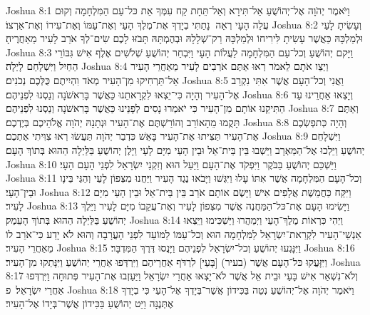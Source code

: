Joshua 8:1	וַיֹּאמֶר יְהֹוָה אֶל־יְהוֹשֻׁעַ אַל־תִּירָא וְאַל־תֵּחָת קַח עִמְּךָ אֵת כּל־עַם הַמִּלְחָמָה וְקוּם עֲלֵה הָעָי רְאֵה  נָתַתִּי בְיָדְךָ אֶת־מֶלֶךְ הָעַי וְאֶת־עַמּוֹ וְאֶת־עִירוֹ וְאֶת־אַרְצוֹ׃
Joshua 8:2	וְעָשִׂיתָ לָעַי וּלְמַלְכָּהּ כַּאֲשֶׁר עָשִׂיתָ לִּירִיחוֹ וּלְמַלְכָּהּ רַק־שְׁלָלָהּ וּבְהֶמְתָּהּ תָּבֹזּוּ לָכֶם שִׂים־לְךָ אֹרֵב לָעִיר מֵאַחֲרֶיהָ׃
Joshua 8:3	וַיָּקם יְהוֹשֻׁעַ וְכל־עַם הַמִּלְחָמָה לַעֲלוֹת הָעָי וַיִּבְחַר יְהוֹשֻׁעַ שְׁלֹשִׁים אֶלֶף אִישׁ גִּבּוֹרֵי הַחַיִל וַיִּשְׁלָחֵם לָיְלָה׃
Joshua 8:4	וַיְצַו אֹתָם לֵאמֹר רְאוּ אַתֶּם אֹרְבִים לָעִיר מֵאַחֲרֵי הָעִיר אַל־תַּרְחִיקוּ מִן־הָעִיר מְאֹד וִהְיִיתֶם כֻּלְּכֶם נְכֹנִים׃
Joshua 8:5	וַאֲנִי וְכל־הָעָם אֲשֶׁר אִתִּי נִקְרַב אֶל־הָעִיר וְהָיָה כִּי־יֵצְאוּ לִקְרָאתֵנוּ כַּאֲשֶׁר בָּרִאשֹׁנָה וְנַסְנוּ לִפְנֵיהֶם׃
Joshua 8:6	וְיָצְאוּ אַחֲרֵינוּ עַד הַתִּיקֵנוּ אוֹתָם מִן־הָעִיר כִּי יֹאמְרוּ נָסִים לְפָנֵינוּ כַּאֲשֶׁר בָּרִאשֹׁנָה וְנַסְנוּ לִפְנֵיהֶם׃
Joshua 8:7	וְאַתֶּם תָּקֻמוּ מֵהָאוֹרֵב וְהוֹרַשְׁתֶּם אֶת־הָעִיר וּנְתָנָהּ יְהֹוָה אֱלֹהֵיכֶם בְּיֶדְכֶם׃
Joshua 8:8	וְהָיָה כְּתפְשְׂכֶם אֶת־הָעִיר תַּצִּיתוּ אֶת־הָעִיר בָּאֵשׁ כִּדְבַר יְהֹוָה תַּעֲשׂוּ רְאוּ צִוִּיתִי אֶתְכֶם׃
Joshua 8:9	וַיִּשְׁלָחֵם יְהוֹשֻׁעַ וַיֵּלְכוּ אֶל־הַמַּאְרָב וַיֵּשְׁבוּ בֵּין בֵּית־אֵל וּבֵין הָעַי מִיָּם לָעָי וַיָּלֶן יְהוֹשֻׁעַ בַּלַּיְלָה הַהוּא בְּתוֹךְ הָעָם׃
Joshua 8:10	וַיַּשְׁכֵּם יְהוֹשֻׁעַ בַּבֹּקֶר וַיִּפְקֹד אֶת־הָעָם וַיַּעַל הוּא וְזִקְנֵי יִשְׂרָאֵל לִפְנֵי הָעָם הָעָי׃
Joshua 8:11	וְכל־הָעָם הַמִּלְחָמָה אֲשֶׁר אִתּוֹ עָלוּ וַיִּגְּשׁוּ וַיָּבֹאוּ נֶגֶד הָעִיר וַיַּחֲנוּ מִצְּפוֹן לָעַי וְהַגַּי בֵּינָו וּבֵין־הָעָי׃
Joshua 8:12	וַיִּקַּח כַּחֲמֵשֶׁת אֲלָפִים אִישׁ וַיָּשֶׂם אוֹתָם אֹרֵב בֵּין בֵּית־אֵל וּבֵין הָעַי מִיָּם לָעִיר׃
Joshua 8:13	וַיָּשִׂימוּ הָעָם אֶת־כּל־הַמַּחֲנֶה אֲשֶׁר מִצְּפוֹן לָעִיר וְאֶת־עֲקֵבוֹ מִיָּם לָעִיר וַיֵּלֶךְ יְהוֹשֻׁעַ בַּלַּיְלָה הַהוּא בְּתוֹךְ הָעֵמֶק׃
Joshua 8:14	וַיְהִי כִּרְאוֹת מֶלֶךְ־הָעַי וַיְמַהֲרוּ וַיַּשְׁכִּימוּ וַיֵּצְאוּ אַנְשֵׁי־הָעִיר לִקְרַאת־יִשְׂרָאֵל לַמִּלְחָמָה הוּא וְכל־עַמּוֹ לַמּוֹעֵד לִפְנֵי הָעֲרָבָה וְהוּא לֹא יָדַע כִּי־אֹרֵב לוֹ מֵאַחֲרֵי הָעִיר׃
Joshua 8:15	וַיִּנָּגְעוּ יְהוֹשֻׁעַ וְכל־יִשְׂרָאֵל לִפְנֵיהֶם וַיָּנֻסוּ דֶּרֶךְ הַמִּדְבָּר׃
Joshua 8:16	וַיִּזָּעֲקוּ כּל־הָעָם אֲשֶׁר (בעיר) [בָּעַי] לִרְדֹּף אַחֲרֵיהֶם וַיִּרְדְּפוּ אַחֲרֵי יְהוֹשֻׁעַ וַיִּנָּתְקוּ מִן־הָעִיר׃
Joshua 8:17	וְלֹא־נִשְׁאַר אִישׁ בָּעַי וּבֵית אֵל אֲשֶׁר לֹא־יָצְאוּ אַחֲרֵי יִשְׂרָאֵל וַיַּעַזְבוּ אֶת־הָעִיר פְּתוּחָה וַיִּרְדְּפוּ אַחֲרֵי יִשְׂרָאֵל׃ {פ}
Joshua 8:18	וַיֹּאמֶר יְהֹוָה אֶל־יְהוֹשֻׁעַ נְטֵה בַּכִּידוֹן אֲשֶׁר־בְּיָדְךָ אֶל־הָעַי כִּי בְיָדְךָ אֶתְּנֶנָּה וַיֵּט יְהוֹשֻׁעַ בַּכִּידוֹן אֲשֶׁר־בְּיָדוֹ אֶל־הָעִיר׃
